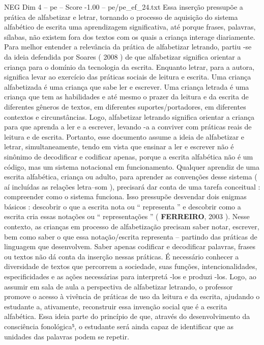 \begin{textsample}{NEG Dim 4 – pe – Score -1.00 – pe/pe\_ef\_24.txt}
Essa inserção pressupõe a prática de alfabetizar e letrar, tornando o processo de aquisição do sistema alfabético de escrita uma aprendizagem significativa, até porque frases, palavras, sílabas, não existem fora dos textos com os quais a criança interage diariamente.
Para melhor entender a relevância da prática de alfabetizar letrando, partiu -se da ideia defendida por Soares ( 2008 ) de que alfabetizar significa orientar a criança para o domínio da tecnologia da escrita.
Enquanto letrar, para a autora, significa levar ao exercício das práticas sociais de leitura e escrita.
Uma criança alfabetizada é uma criança que sabe ler e escrever.
Uma criança letrada é uma criança que tem as habilidades e até mesmo o prazer da leitura e da escrita de diferentes gêneros de textos, em diferentes suportes/portadores, em diferentes contextos e circunstâncias.
Logo, alfabetizar letrando significa orientar a criança para que aprenda a ler e a escrever, levando -a a conviver com práticas reais de leitura e de escrita.
Portanto, esse documento assume a ideia de alfabetizar e letrar, simultaneamente, tendo em vista que ensinar a ler e escrever não é sinônimo de decodificar e codificar apenas, porque a escrita alfabética não é um código, mas um sistema notacional em funcionamento.
Qualquer aprendiz de uma escrita alfabética, criança ou adulto, para aprender as convenções desse sistema ( aí incluídas as relações letra–som ), precisará dar conta de uma tarefa conceitual : compreender como o sistema funciona.
Isso pressupõe desvendar dois enigmas básicos : descobrir o que a escrita nota ou “ representa ” e descobrir como a escrita cria essas notações ou “ representações ” ( \textbf{FERREIRO}, 2003 ).
Nesse contexto, as crianças em processo de alfabetização precisam saber notar, escrever, bem como saber o que essa notação/escrita representa – partindo das práticas de linguagem que desenvolvem.
Saber apenas codificar e decodificar palavras, frases ou textos não dá conta da inserção nessas práticas.
É necessário conhecer a diversidade de textos que percorrem a sociedade, suas funções, intencionalidades, especificidades e as ações necessárias para interpretá -los e produzi -los.
Logo, ao assumir em sala de aula a perspectiva de alfabetizar letrando, o professor promove o acesso à vivência de práticas de uso da leitura e da escrita, ajudando o estudante a, ativamente, reconstruir essa invenção social que é a escrita alfabética.
Essa ideia parte do princípio de que, através do desenvolvimento da consciência fonológica⁵, o estudante será ainda capaz de identificar que as unidades das palavras podem se repetir.

\end{textsample}

